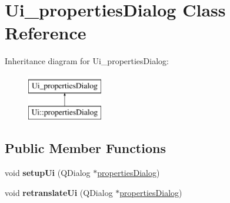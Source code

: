 \hypertarget{class_ui__properties_dialog}{}\section{Ui\+\_\+properties\+Dialog Class Reference}
\label{class_ui__properties_dialog}
Inheritance diagram for Ui\+\_\+properties\+Dialog\+:\begin{figure}[H]
\begin{center}
\leavevmode
\includegraphics[height=2.000000cm]{class_ui__properties_dialog}
\end{center}
\end{figure}
\subsection*{Public Member Functions}
\begin{DoxyCompactItemize}
\item 
\mbox{\label{class_ui__properties_dialog_a595c0d40bd7ea44fd12cb3d08cf5a9fb}} 
void {\bfseries setup\+Ui} (Q\+Dialog $\ast$\mbox{\hyperlink{classproperties_dialog}{properties\+Dialog}})
\item 
\mbox{\label{class_ui__properties_dialog_af4e86fdbed9259bb304605b4d414aecb}} 
void {\bfseries retranslate\+Ui} (Q\+Dialog $\ast$\mbox{\hyperlink{classproperties_dialog}{properties\+Dialog}})
\end{DoxyCompactItemize}
